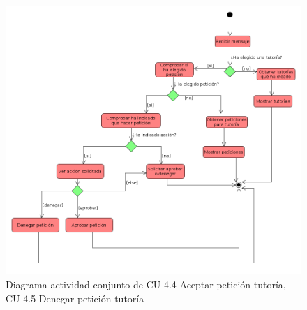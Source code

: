         \begin{figure}[!ht] %
\centering
\includegraphics[scale=0.3]{imagenes/diagramas/actividad/aprobar_denegar_peticiones.png}  %

\caption{Diagrama actividad conjunto de CU-4.4 Aceptar petición tutoría, CU-4.5 Denegar petición tutoría}\label{figura144}
\end{figure}

